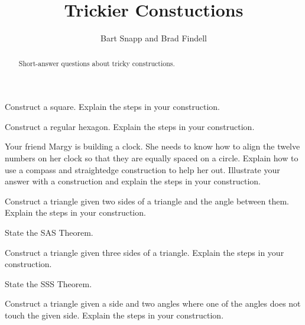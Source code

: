 \documentclass[nooutcomes]{ximera}
\title{Trickier Constuctions}
\author{Bart Snapp and Brad Findell}
\begin{document}
\begin{abstract}
Short-answer questions about tricky constructions. 
\end{abstract}
\maketitle



\begin{problem}
Construct a square. Explain the steps in your construction.
\end{problem}

\begin{problem}
Construct a regular hexagon. Explain the steps in your construction.
\end{problem}

\begin{problem}
Your friend Margy is building a clock. She needs to know how to align
the twelve numbers on her clock so that they are equally spaced on a
circle. Explain how to use a compass and straightedge construction to
help her out. Illustrate your answer with a construction and explain
the steps in your construction.
\end{problem}

\begin{problem}
Construct a triangle given two sides of a triangle and the angle
  between them. Explain the steps in your construction.
\end{problem}

\begin{problem}
State the SAS Theorem.
\end{problem}

\begin{problem}
Construct a triangle given three sides of a triangle. Explain
  the steps in your construction.
\end{problem}

\begin{problem}
State the SSS Theorem.
\end{problem}

\begin{problem}
Construct a triangle given a side and two angles where one of
  the angles does not touch the given side. Explain the steps in your
  construction.
\end{problem}
\end{document}
